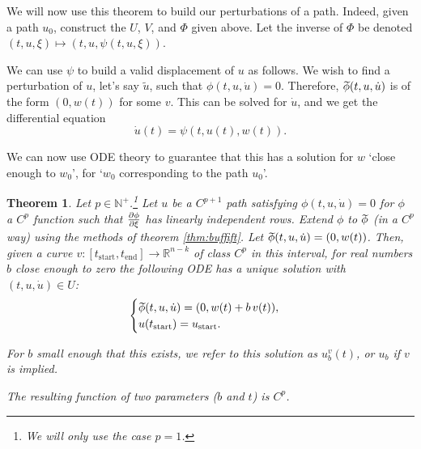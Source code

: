 \documentclass{article}
\theoremstyle{plain}
\newtheorem{theorem}{Theorem}
\theoremstyle{plain}
\theoremstyle{nonumberplain}
\theoremstyle{empty}
\newcommand{\R}{\mathbb{R}}
\newcommand{\N}{\mathbb{N}}
\newcommand{\tstart}{\mathrm{start}}
\newcommand{\tend}{\mathrm{end}}
\newcommand{\wtphi}{
  \mspace{2mu}
  \widetilde{\mspace{-2mu}\smash[t]{\phi}}
}
\begin{document}
We will now use this theorem to build our perturbations of a path. Indeed, given a path $u_0$, construct the $U$, $V$, and $\Phi$ given above. Let the inverse of $\Phi$ be denoted $(t,u,\xi) \mapsto (t,u,\psi(t,u,\xi))$.

We can use $\psi$ to build a valid displacement of $u$ as follows. We wish to find a perturbation of $u$, let's say $\tilde u$, such that $\phi(t,u,\dot u) = 0$. Therefore, $\wtphi(t,u,\dot u)$ is of the form $(0,w(t))$ for some $v$. This can be solved for $\dot u$, and we get the differential equation
\[\dot u(t) = \psi(t,u(t),w(t)).\]

We can now use ODE theory to guarantee that this has a solution for $w$ `close enough to $w_0$', for `$w_0$ corresponding to the path $u_0$'.

\begin{theorem}\label{thm:perturbation}
Let $p \in \N^+$.\footnote{We will only use the case $p = 1$.} Let $u$ be a $C^{p+1}$ path satisfying $\phi(t,u,\dot u) = 0$ for $\phi$ a $C^p$ function such that $\diffp \phi \xi$ has linearly independent rows. Extend $\phi$ to $\wtphi$ (in a $C^p$ way) using the methods of theorem \ref{thm:buffift}. Let $\wtphi(t,u,\dot u) = (0, w(t))$. Then, given a curve $v : [t_\tstart, t_\tend] \to \R^{n-k}$ of class $C^p$ in this interval, for real numbers $b$ close enough to zero the following ODE has a unique solution with $(t,u,\dot u) \in U$:
\[
\begin{cases}
\wtphi(t, u, \dot u) = (0, w(t) + b\,v(t)),\\
u(t_\tstart) = u_\tstart.
\end{cases}
\]

For $b$ small enough that this exists, we refer to this solution as $u_b^v(t)$, or $u_b$ if $v$ is implied.

The resulting function of two parameters ($b$ and $t$) is $C^p$.
\end{theorem}
\end{document}
